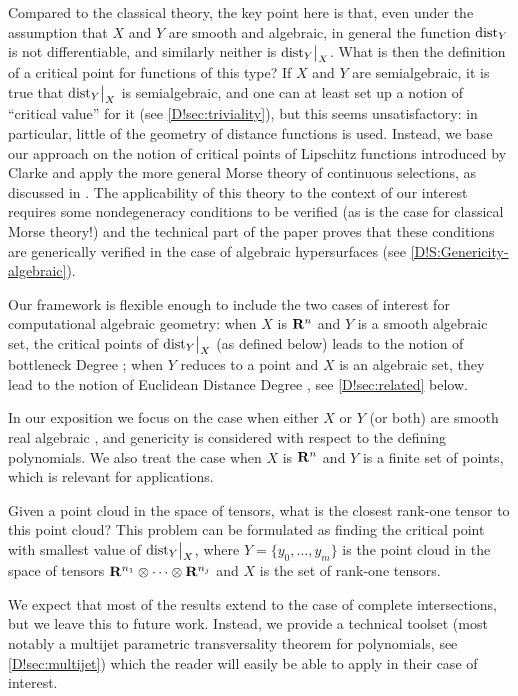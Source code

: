 Compared to the classical theory, the key point here is that, even under the assumption that $X$ and $Y$ are smooth and algebraic, in general the function $\operatorname{dist}_Y$ is not differentiable, and similarly neither is $\mathord{\operatorname{dist}}_Y\big|_X$. What is then the definition of a critical point for functions of this type? If $X$ and $Y$ are semialgebraic, it is true that $\mathord{\operatorname{dist}}_Y\big|_X$ is semialgebraic, and  one can at least set up a notion of ``critical value'' for it (see \cref{D!sec:triviality}), but this seems unsatisfactory: in particular, little of the geometry of distance functions is used.  Instead, we base our approach on the notion of critical points of Lipschitz functions introduced by Clarke \cite{Clarke} and apply the more general Morse theory of continuous selections, as discussed in  \cite{APS1997}. The applicability of this theory to the context of our interest requires some nondegeneracy conditions to be verified (as is the case for classical Morse theory!) and the technical part of the paper proves that these conditions are generically verified in the case of algebraic hypersurfaces (see \cref{D!S:Genericity-algebraic}).

Our framework is flexible enough to include the two cases of interest for computational algebraic geometry: when $X$ is $\mathbf{R}^n$ and $Y$ is a smooth algebraic set, the critical points of $\mathord{\operatorname{dist}}_Y\big|_X$ (as defined below) leads to the notion of bottleneck Degree \cite{DREW2020}; when $Y$ reduces to a point and $X$ is an algebraic set, they  lead to the notion of Euclidean Distance Degree \cite{DHOST2016}, see \cref{D!sec:related} below.

In our exposition we focus on the case when either $X$ or $Y$ (or both) are smooth real algebraic , and genericity is considered with respect to the defining polynomials. We also treat the case when $X$ is $\mathbf{R}^n$ and $Y$ is a finite set of points, which is relevant for applications.

\begin{example}
\label{D!lowrank_approx:example}
  Given a point cloud in the space of tensors, what is the closest rank-one tensor to this point cloud? This problem can be formulated as finding the critical point with smallest value of $\mathord{\operatorname{dist}}_Y\big|_X$, where $Y=\{y_0, \ldots, y_m\}$ is the point cloud in the space of tensors $\mathbf{R}^{n_1}\otimes\cdots \otimes\mathbf{R}^{n_j}$ and $X$ is the set of rank-one tensors.
\end{example}

We expect that most of the results extend to the case of complete intersections, but we leave this to future work. Instead, we provide a technical toolset (most notably a multijet parametric transversality theorem for polynomials, see \cref{D!sec:multijet}) which the reader will easily be able to apply in their case of interest.

